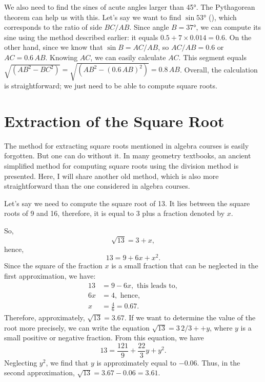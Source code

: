 We also need to find the sines of acute angles larger than \ang{45}. The Pythagorean theorem can help us with this. Let's say we want to find $\sin \ang{53}$ (), which corresponds to the ratio of side $BC/AB$. Since angle $B = \ang{37}$, we can compute its sine using the method described earlier: it equals $0.5 + 7 \times 0.014 = 0.6$. On the other hand, since we know that $\sin B = AC/ AB$, so $AC/AB = 0.6$ or $AC = 0.6 \, AB$. Knowing $AC$, we can easily calculate $AC$. This segment equals $\sqrt{(AB^{2} - BC^{2})} = \sqrt{(AB^{2} - (0.6\, AB)^{2})} = 0.8\, AB$. Overall, the calculation is straightforward; we just need to be able to compute square roots.


\section{Extraction of the Square Root}
\label{sec-5.2}

The method for extracting square roots mentioned in algebra courses is easily forgotten. But one can do without it. In many geometry textbooks, an ancient simplified method for computing square roots using the division method is presented. Here, I will share another old method, which is also more straightforward than the one considered in algebra courses.

Let's say we need to compute the square root of 13. It lies between the square roots of 9 and 16, therefore, it is equal to 3 plus a fraction denoted by $x$.

So,
\begin{equation*}%
\sqrt{13} = 3 + x,
\end{equation*}
hence,
\begin{equation*}%
13 = 9 + 6x + x^{2}.
\end{equation*}
Since the square of the fraction $x$ is a small fraction that can be neglected in the first approximation, we have:
\begin{align*}%
13 &= 9 - 6x, \,\, \text{this leads to}, \\
6x & = 4,\,\, \text{hence,}\\
x & = \frac{4}{6} = 0.67.
\end{align*}
Therefore, approximately, $\sqrt{13} = 3.67$. If we want to determine the value of the root more precisely, we can write the equation $\sqrt{13} = 3 \, 2/3+ + y$, where $y$ is a small positive or negative fraction. From this equation, we have
\begin{equation*}%
13 = \frac{121}{9}  + \frac{22}{3} y  + y^{2}.
\end{equation*}
Neglecting $y^{2}$, we find that $y$ is approximately equal to $-0.06$. Thus, in the second approximation, $\sqrt{13} = 3.67 - 0.06 = 3.61.$

